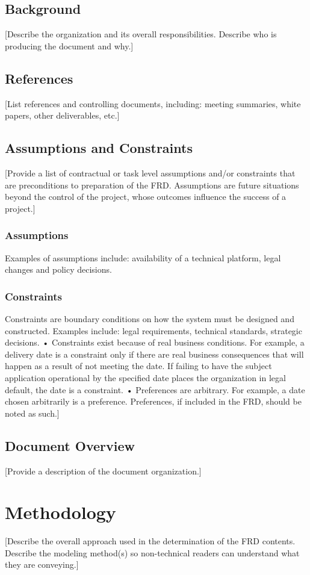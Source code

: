 \documentclass[a4paper,12pt]{article}
\begin{document}
\subsection{Background}
[Describe the organization and its overall responsibilities.  Describe who is producing the document and why.]
\subsection{References}
[List references and controlling documents, including: meeting summaries, white papers, other deliverables, etc.]
\subsection{Assumptions and Constraints}
[Provide a list of contractual or task level assumptions and/or constraints that are preconditions to preparation of the FRD.  Assumptions are future situations beyond the control of the project, whose outcomes influence the success of a project.]
\subsubsection{Assumptions}
Examples of assumptions include: availability of a technical platform, legal changes and policy decisions. 
\subsubsection{Constraints}
Constraints are boundary conditions on how the system must be designed and constructed.  Examples include: legal requirements, technical standards, strategic decisions. 
•	Constraints exist because of real business conditions.  For example, a delivery date is a constraint only if there are real business consequences that will happen as a result of not meeting the date.  If failing to have the subject application operational by the specified date places the organization in legal default, the date is a constraint.
•	Preferences are arbitrary.  For example, a date chosen arbitrarily is a preference.  Preferences, if included in the FRD, should be noted as such.]%


\subsection{Document Overview}
[Provide a description of the document organization.]



\section{Methodology}
[Describe the overall approach used in the determination of the FRD contents.  Describe the modeling method(s) so non-technical readers can understand what they are conveying.]
\end{document}
